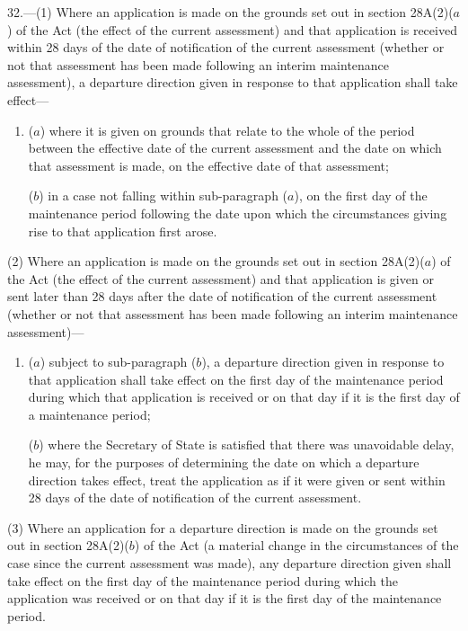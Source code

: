 \documentclass[a4paper]{article}
\begin{document}
32.—(1) Where an application is made on the grounds set out in section 28A(2)($a$) of the Act (the effect of the current assessment) and that application is received within 28 days of the date of notification of the current assessment (whether or not that assessment has been made following an interim maintenance assessment), a departure direction given in response to that application shall take effect—
\begin{enumerate}\item[]
($a$) where it is given on grounds that relate to the whole of the period between the effective date of the current assessment and the date on which that assessment is made, on the effective date of that assessment;

($b$) in a case not falling within sub-paragraph ($a$), on the first day of the maintenance period following the date upon which the circumstances giving rise to that application first arose.
\end{enumerate}

(2) Where an application is made on the grounds set out in section 28A(2)($a$) of the Act (the effect of the current assessment) and that application is given or sent later than 28 days after the date of notification of the current assessment (whether or not that assessment has been made following an interim maintenance assessment)—
\begin{enumerate}\item[]
($a$) subject to sub-paragraph ($b$), a departure direction given in response to that application shall take effect on the first day of the maintenance period during which that application is received or on that day if it is the first day of a maintenance period;

($b$) where the Secretary of State is satisfied that there was unavoidable delay, he may, for the purposes of determining the date on which a departure direction takes effect, treat the application as if it were given or sent within 28 days of the date of notification of the current assessment.
\end{enumerate}

(3) Where an application for a departure direction is made on the grounds set out in section 28A(2)($b$) of the Act (a material change in the circumstances of the case since the current assessment was made), any departure direction given shall take effect on the first day of the maintenance period during which the application was received or on that day if it is the first day of the maintenance period.
\end{document}
